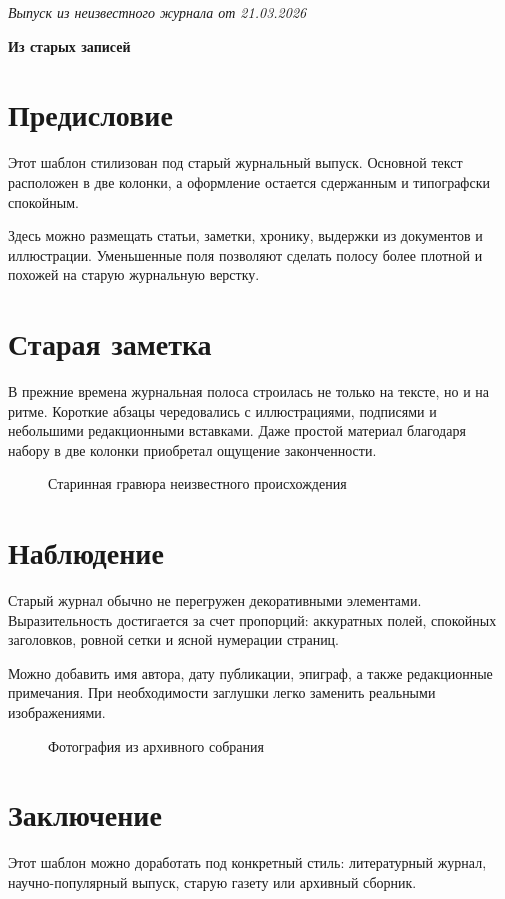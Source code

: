 \documentclass[10pt,a4paper,twocolumn]{article}
\begin{document}
\noindent\small\textit{Выпуск из неизвестного журнала от 21.03.2026}

\vspace{0.4cm}

\begin{center}
    {\LARGE\bfseries Из старых записей}
\end{center}

\vspace{0.3cm}

\section*{Предисловие}

Этот шаблон стилизован под старый журнальный выпуск. Основной текст расположен
в две колонки, а оформление остается сдержанным и типографски спокойным.

Здесь можно размещать статьи, заметки, хронику, выдержки из документов и
иллюстрации. Уменьшенные поля позволяют сделать полосу более плотной и похожей
на старую журнальную верстку.

\section*{Старая заметка}

В прежние времена журнальная полоса строилась не только на тексте, но и на
ритме. Короткие абзацы чередовались с иллюстрациями, подписями и небольшими
редакционными вставками. Даже простой материал благодаря набору в две колонки
приобретал ощущение законченности.

\begin{figure}[h]
\centering
\fbox{\rule{0pt}{4cm}\rule{0.80\columnwidth}{0pt}}
\caption{Старинная гравюра неизвестного происхождения}
\end{figure}

\section*{Наблюдение}

Старый журнал обычно не перегружен декоративными элементами. Выразительность
достигается за счет пропорций: аккуратных полей, спокойных заголовков, ровной
сетки и ясной нумерации страниц.

Можно добавить имя автора, дату публикации, эпиграф, а также редакционные
примечания. При необходимости заглушки легко заменить реальными изображениями.

\begin{figure}[h]
\centering
\fbox{\rule{0pt}{4cm}\rule{0.80\columnwidth}{0pt}}
\caption{Фотография из архивного собрания}
\end{figure}

\section*{Заключение}

Этот шаблон можно доработать под конкретный стиль: литературный журнал,
научно-популярный выпуск, старую газету или архивный сборник.
\end{document}
